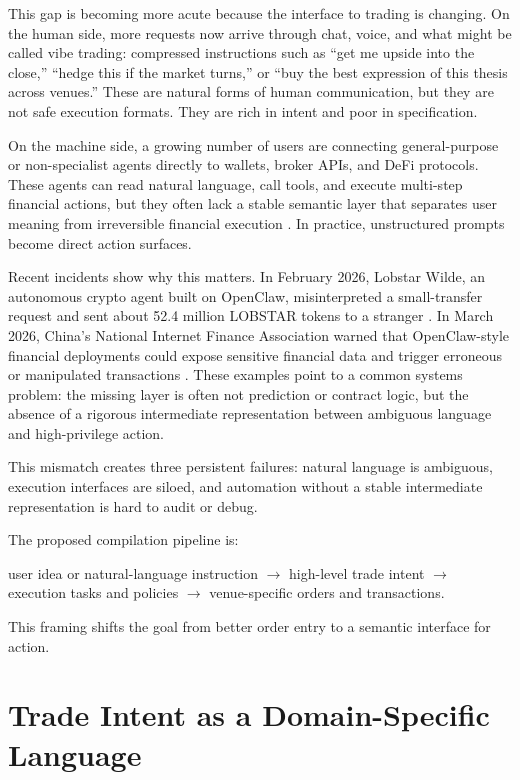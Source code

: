 \documentclass{article}
\begin{document}
This gap is becoming more acute because the interface to trading is changing. On the human side, more requests now arrive through chat, voice, and what might be called vibe trading: compressed instructions such as ``get me upside into the close,'' ``hedge this if the market turns,'' or ``buy the best expression of this thesis across venues.'' These are natural forms of human communication, but they are not safe execution formats. They are rich in intent and poor in specification.

On the machine side, a growing number of users are connecting general-purpose or non-specialist agents directly to wallets, broker APIs, and DeFi protocols. These agents can read natural language, call tools, and execute multi-step financial actions, but they often lack a stable semantic layer that separates user meaning from irreversible financial execution \citep{yao2023react,schick2023toolformer,wei2026clawsafety}. In practice, unstructured prompts become direct action surfaces.

Recent incidents show why this matters. In February 2026, Lobstar Wilde, an autonomous crypto agent built on OpenClaw, misinterpreted a small-transfer request and sent about 52.4 million LOBSTAR tokens to a stranger \citep{balaha2026lobstar}. In March 2026, China's National Internet Finance Association warned that OpenClaw-style financial deployments could expose sensitive financial data and trigger erroneous or manipulated transactions \citep{mlex2026openclawwarning,du2026openclaw}. These examples point to a common systems problem: the missing layer is often not prediction or contract logic, but the absence of a rigorous intermediate representation between ambiguous language and high-privilege action.

This mismatch creates three persistent failures: natural language is ambiguous, execution interfaces are siloed, and automation without a stable intermediate representation is hard to audit or debug.

The proposed compilation pipeline is:
\begin{center}
\small
user idea or natural-language instruction $\rightarrow$ high-level trade intent $\rightarrow$ \\
execution tasks and policies $\rightarrow$ venue-specific orders and transactions.
\end{center}
This framing shifts the goal from better order entry to a semantic interface for action.

\section{Trade Intent as a Domain-Specific Language}
\end{document}
